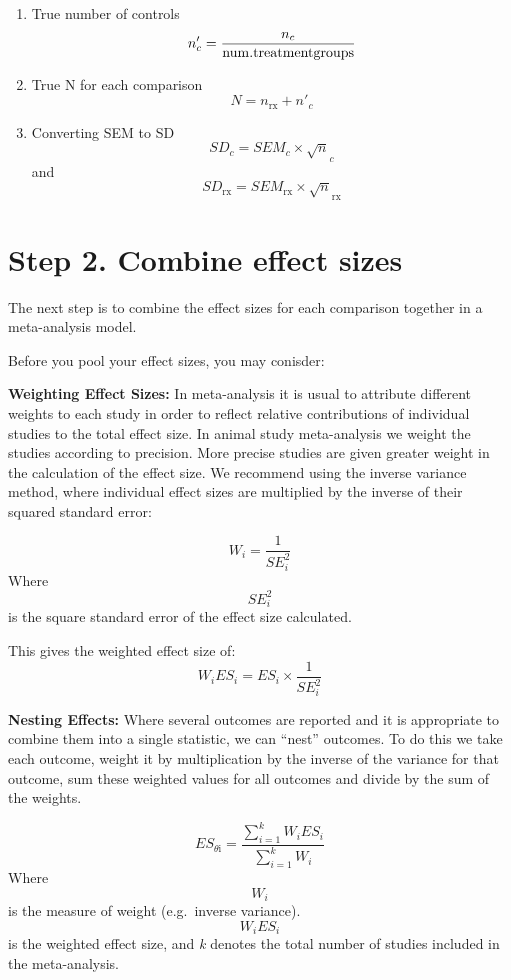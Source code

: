 \documentclass[
]{book}
\begin{document}
\begin{enumerate}
\def\labelenumi{(\arabic{enumi})}
\item
  True number of controls
  \[n'_c = \frac{n_c}{{\rm num. treatment groups}}\]
\item
  True N for each comparison
  \[N = n_{\text{rx}} + n'_c\]
\item
  Converting SEM to SD
  \[ SD_c = SEM_c \times \sqrt n_c \] and \[SD_{\text{rx}} = SEM_{\text{rx}} \times \sqrt n_{\text{rx}} \]
\end{enumerate}

\hypertarget{step-2.-combine-effect-sizes}{%
\section{Step 2. Combine effect sizes}\label{step-2.-combine-effect-sizes}}

The next step is to combine the effect sizes for each comparison together in a meta-analysis model.

Before you pool your effect sizes, you may conisder:

\textbf{Weighting Effect Sizes:}
In meta-analysis it is usual to attribute different weights to each study in order to reflect relative contributions of individual studies to the total effect size. In animal study meta-analysis we weight the studies according to precision. More precise studies are given greater weight in the calculation of the effect size. We recommend using the inverse variance method, where individual effect sizes are multiplied by the inverse of their squared standard error:

\[W_i = \frac{1}{SE^2_i} \]
Where \[{SE^2_i}\] is the square standard error of the effect size calculated.

This gives the weighted effect size of:
\[W_iES_i = ES_i \times \frac{1}{SE^2_i} \]

\textbf{Nesting Effects:}
Where several outcomes are reported and it is appropriate to combine them into a single statistic, we can ``nest'' outcomes. To do this we take each outcome, weight it by multiplication by the inverse of the variance for that outcome, sum these weighted values for all outcomes and divide by the sum of the weights.

\[ES_{\theta\text{i}} = \frac{\sum_{i=1}^{k} W_iES_i}{\sum_{i=1}^{k} W_i} \]
Where \[W_i\] is the measure of weight (e.g.~inverse variance). \[W_iES_i \] is the weighted effect size, and \emph{k} denotes the total number of studies included in the meta-analysis.
\end{document}
